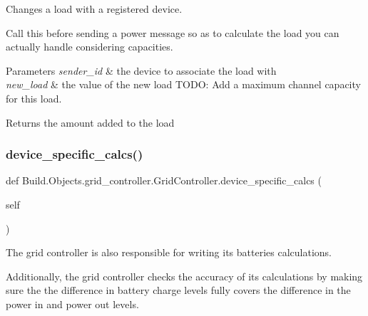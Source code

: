 Changes a load with a registered device. 

Call this before sending a power message so as to calculate the load you can actually handle considering capacities. 
\begin{DoxyParams}{Parameters}
{\em sender\+\_\+id} & the device to associate the load with \\
\hline
{\em new\+\_\+load} & the value of the new load T\+O\+DO\+: Add a maximum channel capacity for this load. \\
\hline
\end{DoxyParams}
\begin{DoxyReturn}{Returns}
the amount added to the load 
\end{DoxyReturn}
\mbox{\label{class_build_1_1_objects_1_1grid__controller_1_1_grid_controller_ae5087a1b8b5278e6340b027a860353dd}} 
\subsubsection{\texorpdfstring{device\+\_\+specific\+\_\+calcs()}{device\_specific\_calcs()}}
{\footnotesize\ttfamily def Build.\+Objects.\+grid\+\_\+controller.\+Grid\+Controller.\+device\+\_\+specific\+\_\+calcs (\begin{DoxyParamCaption}\item[{}]{self }\end{DoxyParamCaption})}



The grid controller is also responsible for writing its batteries calculations. 

Additionally, the grid controller checks the accuracy of its calculations by making sure the the difference in battery charge levels fully covers the difference in the power in and power out levels. \mbox{\label{class_build_1_1_objects_1_1grid__controller_1_1_grid_controller_a9c3ee1f54a453b5008d1118d9da1b8ed}} 
